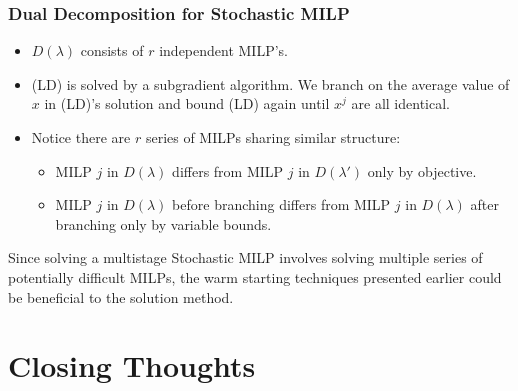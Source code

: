 \documentclass{beamer}
\begin{document}
	\begin{frame}[t]
		\frametitle{Dual Decomposition for Stochastic MILP}
		\small
		\vspace{0cm}
		\begin{itemize}
			\item $ D(\lambda) $ consists of $ r $ independent MILP's.
			\item (LD) is solved by a subgradient algorithm. We branch on the average value of $ x $ in (LD)'s solution and bound (LD) again until $ x^j $ are all identical.
			\item Notice there are $ r $ series of MILPs sharing similar structure:
			\begin{itemize}
				\item MILP $ j $ in $ D(\lambda) $ differs from MILP $ j $ in $ D(\lambda') $ only by objective.
				\item MILP $ j $ in $ D(\lambda) $ before branching differs from MILP $ j $ in $ D(\lambda) $ after branching only by variable bounds.
			\end{itemize}
		\end{itemize}
		\vspace{1.5cm}
		\begin{block}{}
			Since solving a multistage Stochastic MILP involves solving multiple series of potentially difficult MILPs, the warm starting techniques presented earlier could be beneficial to the solution method.
		\end{block}
		\normalsize
	\end{frame}
	
	\section{Closing Thoughts}
	
\end{document}
